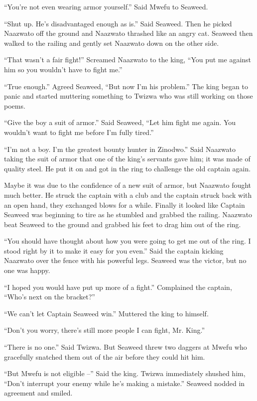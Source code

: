 ``You're not even wearing armor yourself.'' Said Mwe\-fu to Seaweed.

``Shut up. He's disadvantaged enough as is.'' Said Seaweed. Then he picked Naa\-zwa\-to off the ground and Naa\-zwa\-to thrashed like an angry cat. Seaweed then walked to the railing and gently set Naa\-zwa\-to down on the other side.

``That wasn't a fair fight!'' Screamed Naa\-zwa\-to to the king, ``You put me against him so you wouldn't have to fight me.''

``True enough.'' Agreed Seaweed, ``But now I'm his problem.'' The king began to panic and started muttering something to Twi\-zwa who was still working on those poems.

``Give the boy a suit of armor.'' Said Seaweed, ``Let him fight me again. You wouldn't want to fight me before I'm fully tired.''

``I'm not a boy. I'm the greatest bounty hunter in Zi\-no\-dwo.'' Said Naa\-zwa\-to taking the suit of armor that one of the king's servants gave him; it was made of quality steel. He put it on and got in the ring to challenge the old captain again.

Maybe it was due to the confidence of a new suit of armor, but Naa\-zwa\-to fought much better. He struck the captain with a club and the captain struck back with an open hand, they exchanged blows for a while. Finally it looked like Captain Seaweed was beginning to tire as he stumbled and grabbed the railing. Naa\-zwa\-to beat Seaweed to the ground and grabbed his feet to drag him out of the ring.

``You should have thought about how you were going to get me out of the ring. I stood right by it to make it easy for you even.'' Said the captain kicking Naa\-zwa\-to over the fence with his powerful legs.
Seaweed was the victor, but no one was happy.

``I hoped you would have put up more of a fight.'' Complained the captain, ``Who's next on the bracket?''

``We can't let Captain Seaweed win.'' Muttered the king to himself.

``Don't you worry, there's still more people I can fight, Mr. King.''

``There is no one.'' Said Twi\-zwa. But Seaweed threw two daggers at Mwe\-fu who gracefully snatched them out of the air before they could hit him. 

``But Mwe\-fu is not eligible --'' Said the king. Twi\-zwa immediately shushed him, ``Don't interrupt your enemy while he's making a mistake.'' Seaweed nodded in agreement and smiled.


